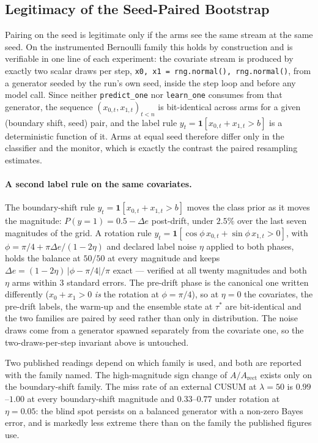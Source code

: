 \subsection{Legitimacy of the Seed-Paired Bootstrap}\label{sec:protocol_paired}

Pairing on the seed is legitimate only if the arms see the same stream at the same seed. On the
instrumented Bernoulli family this holds by construction and is verifiable in one line of each
experiment: the covariate stream is produced by exactly two scalar draws per step,
\texttt{x0, x1 = rng.normal(), rng.normal()}, from a generator seeded by the run's own seed, inside
the step loop and before any model call. Since neither \texttt{predict\_one} nor \texttt{learn\_one}
consumes from that generator, the sequence $(x_{0,t}, x_{1,t})_{t<n}$ is bit-identical across arms
for a given (boundary shift, seed) pair, and the label rule $y_t = \mathbf{1}[x_{0,t} + x_{1,t} > b]$
is a deterministic function of it. Arms at equal seed therefore differ only in the classifier and
the monitor, which is exactly the contrast the paired resampling estimates.

\paragraph{A second label rule on the same covariates.} The boundary-shift rule
$y_t = \mathbf{1}[x_{0,t} + x_{1,t} > b]$ moves the class prior as it moves the
magnitude: $P(y{=}1) = 0.5 - \Delta e$ post-drift, under $2.5\%$ over the last
seven magnitudes of the grid. A rotation rule
$y_t = \mathbf{1}[\cos\phi\, x_{0,t} + \sin\phi\, x_{1,t} > 0]$, with
$\phi = \pi/4 + \pi \Delta e / (1 - 2\eta)$ and declared label noise $\eta$
applied to both phases, holds the balance at $50/50$ at every magnitude and
keeps $\Delta e = (1-2\eta)\,|\phi - \pi/4| / \pi$ exact --- verified at all
twenty magnitudes and both $\eta$ arms within $3$ standard errors. The
pre-drift phase is the canonical one written differently
($x_0 + x_1 > 0$ \emph{is} the rotation at $\phi = \pi/4$), so at $\eta = 0$ the
covariates, the pre-drift labels, the warm-up and the ensemble state at $\tau^*$
are bit-identical and the two families are paired by seed rather than only in
distribution. The noise draws come from a generator spawned separately from the
covariate one, so the two-draws-per-step invariant above is untouched.

Two published readings depend on which family is used, and both are reported
with the family named. The high-magnitude sign change of $A/A_{\mathrm{rect}}$
exists only on the boundary-shift family. The miss rate of an external CUSUM at
$\lambda = 50$ is $0.99$--$1.00$ at every boundary-shift magnitude and
$0.33$--$0.77$ under rotation at $\eta = 0.05$: the blind spot persists on a
balanced generator with a non-zero Bayes error, and is markedly less extreme
there than on the family the published figures use.

